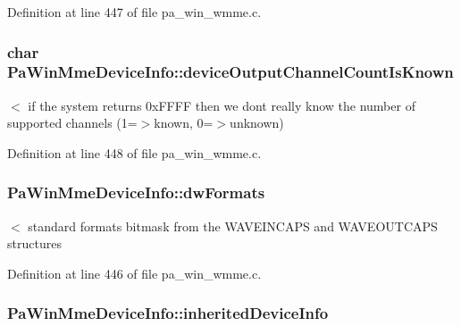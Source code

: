 Definition at line 447 of file pa\+\_\+win\+\_\+wmme.\+c.

\subsubsection[{\texorpdfstring{device\+Output\+Channel\+Count\+Is\+Known}{deviceOutputChannelCountIsKnown}}]{\setlength{\rightskip}{0pt plus 5cm}char Pa\+Win\+Mme\+Device\+Info\+::device\+Output\+Channel\+Count\+Is\+Known}\hypertarget{struct_pa_win_mme_device_info_aac6761abcaab988982f5a139e3af48b0}{}\label{struct_pa_win_mme_device_info_aac6761abcaab988982f5a139e3af48b0}
$<$ if the system returns 0x\+F\+F\+FF then we don\textquotesingle{}t really know the number of supported channels (1=$>$known, 0=$>$unknown) 

Definition at line 448 of file pa\+\_\+win\+\_\+wmme.\+c.

\subsubsection[{\texorpdfstring{dw\+Formats}{dwFormats}}]{ Pa\+Win\+Mme\+Device\+Info\+::dw\+Formats}\hypertarget{struct_pa_win_mme_device_info_a97ceb9b0ee1f0ea0f2207f58d373d197}{}\label{struct_pa_win_mme_device_info_a97ceb9b0ee1f0ea0f2207f58d373d197}
$<$ standard formats bitmask from the W\+A\+V\+E\+I\+N\+C\+A\+PS and W\+A\+V\+E\+O\+U\+T\+C\+A\+PS structures 

Definition at line 446 of file pa\+\_\+win\+\_\+wmme.\+c.

\subsubsection[{\texorpdfstring{inherited\+Device\+Info}{inheritedDeviceInfo}}]{ Pa\+Win\+Mme\+Device\+Info\+::inherited\+Device\+Info}\hypertarget{struct_pa_win_mme_device_info_a846b6b2dead7d75bf3abf3e087304745}{}\label{struct_pa_win_mme_device_info_a846b6b2dead7d75bf3abf3e087304745}


